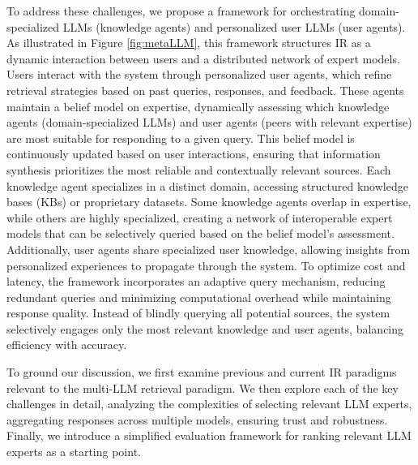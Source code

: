 To address these challenges, we propose a framework for orchestrating domain-specialized LLMs (knowledge agents) and personalized user LLMs (user agents). As illustrated in Figure \ref{fig:metaLLM}, this framework structures IR as a dynamic interaction between users and a distributed network of expert models.
Users interact with the system through personalized user agents, which refine retrieval strategies based on past queries, responses, and feedback. These agents maintain a belief model on expertise, dynamically assessing which knowledge agents (domain-specialized LLMs) and user agents (peers with relevant expertise) are most suitable for responding to a given query. This belief model is continuously updated based on user interactions, ensuring that information synthesis prioritizes the most reliable and contextually relevant sources.
Each knowledge agent specializes in a distinct domain, accessing structured knowledge bases (KBs) or proprietary datasets. Some knowledge agents overlap in expertise, while others are highly specialized, creating a network of interoperable expert models that can be selectively queried based on the belief model's assessment. Additionally, user agents share specialized user knowledge, allowing insights from personalized experiences to propagate through the system.
To optimize cost and latency, the framework incorporates an adaptive query mechanism, reducing redundant queries and minimizing computational overhead while maintaining response quality. Instead of blindly querying all potential sources, the system selectively engages only the most relevant knowledge and user agents, balancing efficiency with accuracy.

To ground our discussion, we first examine previous and current IR paradigms relevant to the  multi-LLM retrieval paradigm. We then explore each of the key challenges in detail, analyzing the complexities of selecting relevant LLM experts, aggregating responses across multiple models, ensuring trust and robustness. Finally, we introduce a simplified evaluation framework for ranking relevant LLM experts as a starting point.
